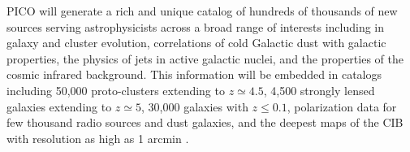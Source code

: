\documentclass[PICOAPC.tex]{subfiles}
\begin{document}

PICO will generate a rich and unique catalog of hundreds of thousands of new sources serving astrophysicists across a broad range of interests including in galaxy and cluster evolution, correlations of cold Galactic dust with galactic properties, the physics of jets in active galactic nuclei, and the properties of the cosmic infrared background. This information will be embedded in catalogs including 50,000 proto-clusters extending to $z\simeq 4.5$, 4,500 strongly lensed galaxies extending to $z\simeq 5$, 30,000 galaxies with $z\leq 0.1$, polarization data for few thousand radio sources and dust galaxies, and the deepest maps of the CIB with resolution as high as 1 arcmin . 
\end{document}
